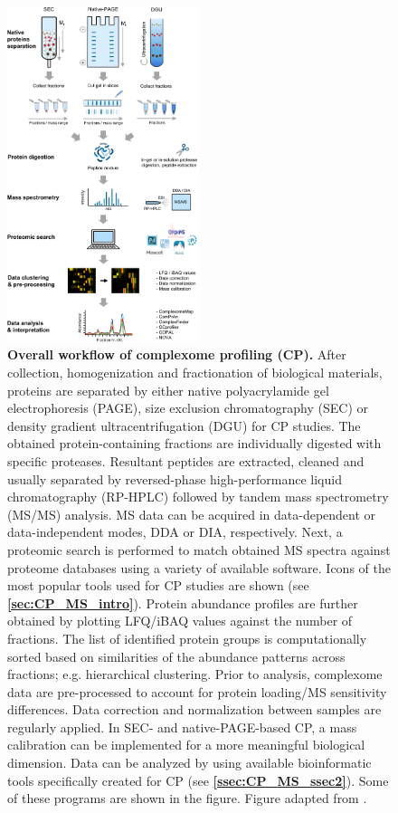 \begin{figure}[hbt!]
\center
\includegraphics[width=0.5\textwidth]{Chapter.1/Figures/Figure5.png} 
\caption{\textbf{Overall workflow of complexome profiling (CP).} After collection, homogenization and fractionation of biological materials, proteins are separated by either native polyacrylamide gel electrophoresis (PAGE), size exclusion chromatography (SEC) or density gradient ultracentrifugation (DGU) for CP studies. The obtained protein-containing fractions are individually digested with specific proteases. Resultant peptides are extracted, cleaned and usually separated by reversed-phase high-performance liquid chromatography (RP-HPLC) followed by tandem mass spectrometry (MS/MS) analysis. MS data can be acquired in data-dependent or data-independent modes, DDA or DIA, respectively. Next, a proteomic search is performed to match obtained MS spectra against proteome databases using a variety of available software. Icons of the most popular tools used for CP studies are shown (see \textbf{\autoref{sec:CP_MS_intro}}). Protein abundance profiles are further obtained by plotting LFQ/iBAQ values against the number of fractions. The list of identified protein groups is computationally sorted based on similarities of the abundance patterns across fractions; e.g. hierarchical clustering. Prior to analysis, complexome data are pre-processed to account for protein loading/MS sensitivity differences. Data correction and normalization between samples are regularly applied. In SEC- and native-PAGE-based CP, a mass calibration can be implemented for a more meaningful biological dimension. Data can be analyzed by using available bioinformatic tools specifically created for CP (see \textbf{\autoref{ssec:CP_MS_ssec2}}). Some of these programs are shown in the figure. Figure adapted from \cite{Cabrera-Orefice_2022}.}
\label{fig:fig5}
\end{figure}
